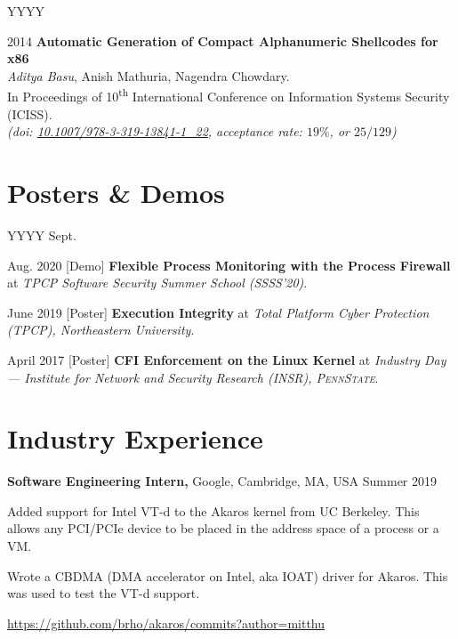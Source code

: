 \documentclass[margin]{res}
\newcommand{\psu}{\textsc{PennState}}
\newcommand{\doi}[1]{\href{http://dx.doi.org/#1}{#1}}
\begin{document}
\begin{resume}
\begin{labeling}{YYYY}
\item[2014]
    \textbf{Automatic Generation of Compact Alphanumeric Shellcodes for x86}\\
    \emph{Aditya Basu}, Anish Mathuria, Nagendra Chowdary.\\
    In Proceedings of 10\textsuperscript{th} International Conference on Information Systems Security (ICISS).\\
    {\itshape (doi: \doi{10.1007/978-3-319-13841-1\_22}, acceptance rate: $19\%$, or $25/129$)}
\end{labeling}

\section{Posters \& Demos}

\begin{labeling}{YYYY Sept.}

\item[Aug. 2020] [Demo] \textbf{Flexible Process Monitoring with the Process Firewall} at \emph{TPCP Software Security Summer School (SSSS’20)}.

\item[June 2019] [Poster] \textbf{Execution Integrity} at \emph{Total Platform Cyber Protection (TPCP), Northeastern University}.

\item[April 2017] [Poster] \textbf{CFI Enforcement on the Linux Kernel} at \emph{Industry Day --- Institute for Network and Security Research (INSR), \psu}.

\end{labeling}

\section{Industry Experience}

{\bf Software Engineering Intern,} Google, Cambridge, MA, USA
\hfill Summer  2019 %
\begin{itemizeexp}
    \item Added support for Intel VT-d to the Akaros kernel from UC Berkeley.
    This allows any PCI/PCIe device to be placed in the address space of a process or a VM.
    \item Wrote a CBDMA (DMA accelerator on Intel, aka IOAT) driver for Akaros.
    This was used to test the VT-d support.
    \item \url{https://github.com/brho/akaros/commits?author=mitthu}
\end{itemizeexp}


\end{resume}
\end{document}
